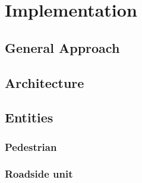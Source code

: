 \chapter{Implementation}
\label{cha:Implementation}

\section{General Approach}

\section{Architecture}

\section{Entities}

\subsection{Pedestrian}

\subsection{Roadside unit}